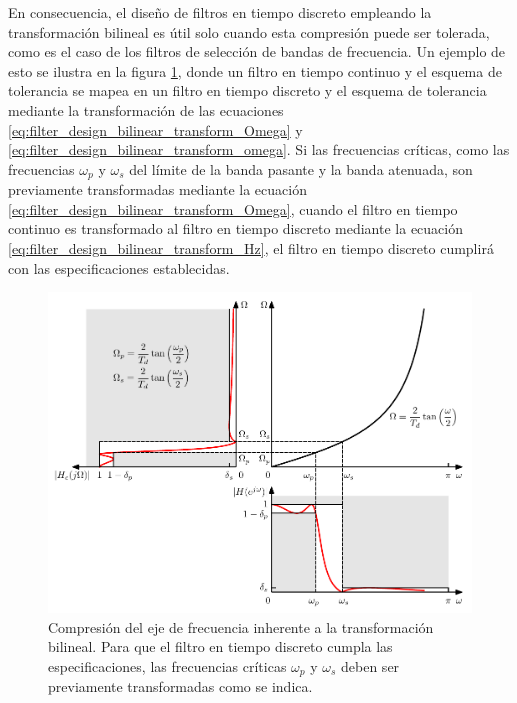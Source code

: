 \documentclass[a4paper]{report}
\begin{document}
En consecuencia, el diseño de filtros en tiempo discreto empleando la transformación bilineal es útil solo cuando esta compresión puede ser tolerada, como es el caso de los filtros de selección de bandas de frecuencia. Un ejemplo de esto  se ilustra en la figura \ref{fig:filter_design_bilinear_specifications_mapping}, donde un filtro en tiempo continuo y el esquema de tolerancia se mapea en un filtro en tiempo discreto y el esquema de tolerancia mediante la transformación de las ecuaciones \ref{eq:filter_design_bilinear_transform_Omega} y \ref{eq:filter_design_bilinear_transform_omega}. Si las frecuencias críticas, como las frecuencias \(\omega_p\) y \(\omega_s\) del límite de la banda pasante y la banda atenuada, son previamente transformadas mediante la ecuación \ref{eq:filter_design_bilinear_transform_Omega}, cuando el filtro en tiempo continuo es transformado al filtro en tiempo discreto mediante la ecuación \ref{eq:filter_design_bilinear_transform_Hz}, el filtro en tiempo discreto cumplirá con las especificaciones establecidas.
\begin{figure}[!htb]
 \begin{center}
 \includegraphics[width=1\textwidth]{figuras/filter_design_bilinear_specifications_mapping.pdf}
 \caption{\label{fig:filter_design_bilinear_specifications_mapping} Compresión del eje de frecuencia inherente a la transformación bilineal. Para que el filtro en tiempo discreto cumpla las especificaciones, las frecuencias críticas \(\omega_p\) y \(\omega_s\) deben ser previamente transformadas como se indica.}
 \end{center}
\end{figure}
\end{document}
